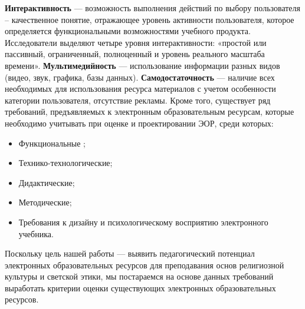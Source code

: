 \textbf{Интерактивность} --- возможность выполнения действий по выбору пользователя – качественное понятие, отражающее уровень активности пользователя, которое определяется функциональными возможностями учебного продукта.
Исследователи выделяют четыре уровня интерактивности: «простой или пассивный, ограниченный, полноценный и уровень реального масштаба времени»\cite{kochisov15}.
\textbf{Мультимедийность} --- использование информации разных видов (видео, звук, графика, базы данных).
\textbf{Самодостаточность} --- наличие всех необходимых для использования ресурса материалов с учетом особенности категории пользователя, отсутствие рекламы.
Кроме того, существует ряд требований\cite[c. 85-90]{larin}, предъявляемых к электронным образовательным ресурсам, которые необходимо учитывать при оценке и проектировании ЭОР, среди которых:
\begin{itemize}
\item Функциональные ;
\item Технико-технологические;
\item Дидактические;
\item Методические;
\item Требования к дизайну и психологическому восприятию электронного учебника.
\end{itemize}

Поскольку цель нашей работы --- выявить педагогический потенциал электронных образовательных ресурсов для преподавания основ религиозной культуры и светской этики, мы постараемся на основе данных требований выработать критерии оценки существующих электронных образовательных ресурсов.

